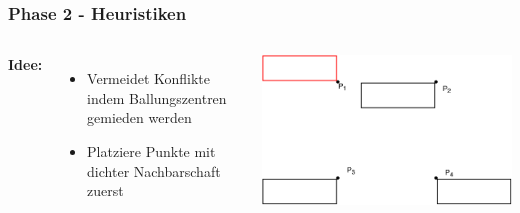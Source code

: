 \documentclass[aspectratio=169]{beamer}
\begin{document}
\begin{frame}
	\frametitle{Phase 2 - Heuristiken}
	\begin{columns}[c] %
		
		\textbf{Idee:}
		\begin{itemize}
			\item  Vermeidet Konflikte indem Ballungszentren gemieden werden
			\item Platziere Punkte mit dichter Nachbarschaft zuerst
		\end{itemize}
		\includegraphics[scale=.6]{normals_conflict.pdf}
		
		
		
	\end{columns}
	\end{frame}
	
\end{document}
